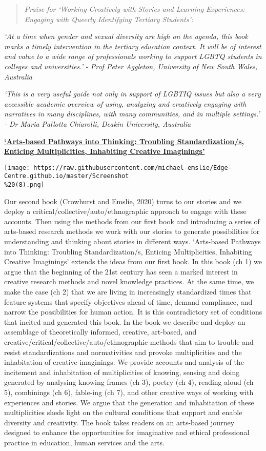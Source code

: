 \documentclass[
]{article}
\begin{document}
\begin{quote}
\emph{Praise for `Working Creatively with Stories and Learning
Experiences: Engaging with Queerly Identifying Tertiary Students':}
\end{quote}

\emph{`At a time when gender and sexual diversity are high on the
agenda, this book marks a timely intervention in the tertiary education
context. It will be of interest and value to a wide range of
professionals working to support LGBTQ students in colleges and
universities.'} \emph{- Prof Peter Aggleton, University of New South
Wales, Australia}

\emph{`This is a very useful guide not only in support of LGBTIQ issues
but also a very accessible academic overview of using, analyzing and
creatively engaging with narratives in many disciplines, with many
communities, and in multiple settings.'} \emph{- Dr Maria Pallotta
Chiarolli, Deakin University, Australia}

\href{https://www.springer.com/gp/book/9783030375065}{\textbf{`Arts-based
Pathways into Thinking: Troubling Standardization/s, Enticing
Multiplicities, Inhabiting Creative Imaginings'}}

\texttt{[image: https://raw.githubusercontent.com/michael-emslie/Edge-Centre.github.io/master/Screenshot\\\%20(8).png]}

Our second book (Crowhurst and Emslie, 2020) turns to our stories and we
deploy a critical/collective/auto/ethnographic approach to engage with
these accounts. Then using the methods from our first book and
introducing a series of arts-based research methods we work with our
stories to generate possibilities for understanding and thinking about
stories in different ways. `Arts-based Pathways into Thinking: Troubling
Standardization/s, Enticing Multiplicities, Inhabiting Creative
Imaginings' extends the ideas from our first book. In this book (ch 1)
we argue that the beginning of the 21st century has seen a marked
interest in creative research methods and novel knowledge practices. At
the same time, we make the case (ch 2) that we are living in
increasingly standardized times that feature systems that specify
objectives ahead of time, demand compliance, and narrow the
possibilities for human action. It is this contradictory set of
conditions that incited and generated this book. In the book we describe
and deploy an assemblage of theoretically informed, creative, art-based,
and creative/critical/collective/auto/ethnographic methods that aim to
trouble and resist standardizations and normativities and provoke
multiplicities and the inhabitation of creative imaginings. We provide
accounts and analysis of the incitement and inhabitation of
multiplicities of knowing, sensing and doing generated by analysing
knowing frames (ch 3), poetry (ch 4), reading aloud (ch 5), combinings
(ch 6), fable-ing (ch 7), and other creative ways of working with
experiences and stories. We argue that the generation and inhabitation
of these multiplicities sheds light on the cultural conditions that
support and enable diversity and creativity. The book takes readers on
an arts-based journey designed to enhance the opportunities for
imaginative and ethical professional practice in education, human
services and the arts.
\end{document}
